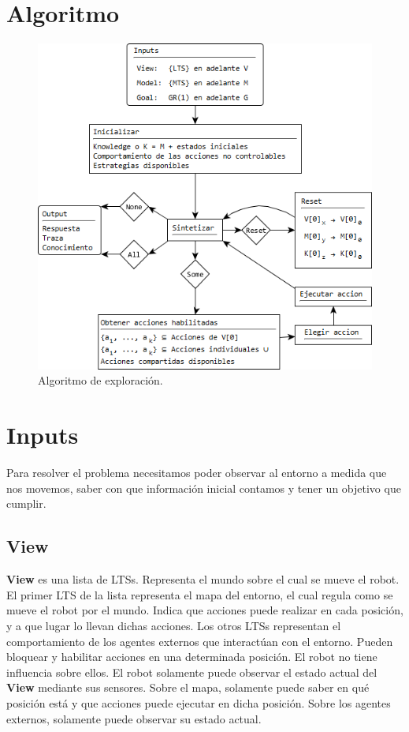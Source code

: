 \section{Algoritmo}

\begin{figure}[H]
  \centering
    \includegraphics[scale=0.8]{Imagenes/Algoritmo/Algoritmo.png}
  \caption{Algoritmo de exploración.}
  \label{fig:Algoritmo}
\end{figure}

\section{Inputs}

Para resolver el problema necesitamos poder observar al entorno a medida que nos movemos, saber con que información inicial 
contamos y tener un objetivo que cumplir.

\subsection{View}
\textbf{View} es una lista de LTSs. Representa el mundo sobre el cual se mueve el robot. 
El primer LTS de la lista representa el mapa del entorno, el cual regula como se mueve el robot por el mundo. Indica que acciones 
puede realizar en cada posición, y a que lugar lo llevan dichas acciones. 
Los otros LTSs representan el comportamiento de los agentes externos que interactúan con el entorno. Pueden bloquear y habilitar 
acciones en una determinada posición. El robot no tiene influencia sobre ellos. 
El robot solamente puede observar el estado actual del \textbf{View} mediante sus sensores. Sobre el mapa, solamente puede saber en qué posición 
está y que acciones puede ejecutar en dicha posición. Sobre los agentes externos, solamente puede observar su estado actual.

